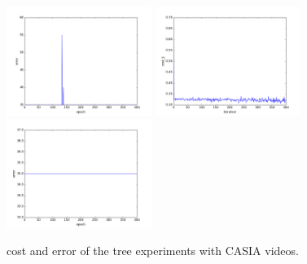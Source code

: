 \begin{figure}[htb]
\includegraphics[width=0.42\textwidth]{images/redes/ejecucion1/general_svm_casia_video/minidataset_tested_itself/error.png}
\includegraphics[width=0.42\textwidth]{images/redes/ejecucion1/general_svm_casia_video/minidataset_tested_iteself_lr_0_001/cost.png}
\includegraphics[width=0.42\textwidth]{images/redes/ejecucion1/general_svm_casia_video/minidataset_tested_iteself_lr_0_001/error.png}
\caption{cost and error of the tree experiments with CASIA videos.} \label{fig:casiavid-ejec1}
\end{figure}

